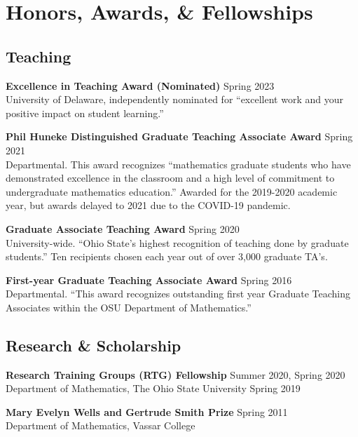 \documentclass[10pt,letterpaper]{article}
\renewenvironment{itemize}{
  \begin{list}{}{
    \setlength{\leftmargin}{1.5em}
    \setlength{\itemsep}{0.25em}
    \setlength{\parskip}{0pt}
    \setlength{\parsep}{0.25em}
  }
}{
  \end{list}
}
\begin{document}
\section*{Honors, Awards, \& Fellowships}





\subsection*{Teaching}
\begin{itemize}

\item {\bf Excellence in Teaching Award (Nominated)} \hfill Spring 2023\\
University of Delaware, independently nominated for ``excellent work and your positive impact on student learning.''

\item{\bf Phil Huneke Distinguished Graduate Teaching Associate Award} \hfill Spring 2021\\
Departmental. This award recognizes ``mathematics graduate students who have demonstrated excellence in the classroom and a high level of commitment to undergraduate mathematics education.'' Awarded for the 2019-2020 academic year, but awards delayed to 2021 due to the COVID-19 pandemic.



\item {\bf Graduate Associate Teaching Award} \hfill Spring 2020\\
 University-wide. ``Ohio State's highest recognition of teaching done by graduate students.'' Ten recipients chosen each year out of over 3,000 graduate TA's.
\item {\bf First-year Graduate Teaching Associate Award} \hfill Spring 2016 \\
Departmental. ``This award recognizes outstanding first year Graduate Teaching Associates within the OSU Department of Mathematics.''

\end{itemize}

\subsection*{Research \& Scholarship}
\begin{itemize}
\item {\bf Research Training Groups (RTG) Fellowship} \hfill
  Summer 2020, Spring 2020 \\
  {Department of Mathematics, The Ohio State University} \hfill Spring 2019

\item {\bf Mary Evelyn Wells and Gertrude Smith Prize} \hfill Spring 2011\\
{Department of Mathematics, Vassar College}


\end{itemize}
\end{document}
